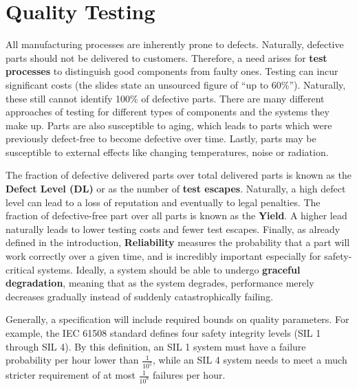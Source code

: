 \documentclass{report}
\newcommand{\tbf}{\textbf}
\newcommand*{\newpar}{\par\vspace{\baselineskip}\noindent} %
\begin{document}
\section{Quality Testing}
All manufacturing processes are inherently prone to defects. Naturally, defective parts should not be delivered to customers. Therefore, a need arises for \tbf{test processes} to distinguish good components from faulty ones. Testing can incur significant costs (the slides state an unsourced figure of ``up to 60\%''). Naturally, these still cannot identify 100\% of defective parts. There are many different approaches of testing for different types of components and the systems they make up. Parts are also susceptible to aging, which leads to parts which were previously defect-free to become defective over time. Lastly, parts may be susceptible to external effects like changing temperatures, noise or radiation.
\newpar
The fraction of defective delivered parts over total delivered parts is known as the \tbf{Defect Level (DL)} or as the number of \tbf{test escapes}. Naturally, a high defect level can lead to a loss of reputation and eventually to legal penalties. The fraction of defective-free part over all parts is known as the \tbf{Yield}. A higher lead naturally leads to lower testing costs and fewer test escapes. Finally, as already defined in the introduction, \tbf{Reliability} measures the probability that a part will work correctly over a given time, and is incredibly important especially for safety-critical systems. Ideally, a system should be able to undergo \tbf{graceful degradation}, meaning that as the system degrades, performance merely decreases gradually instead of suddenly catastrophically failing.
\newpar
Generally, a specification will include required bounds on quality parameters. For example, the IEC 61508 standard defines four safety integrity levels (SIL 1 through SIL 4). By this definition, an SIL 1 system must have a failure probability per hour lower than $\frac{1}{10^5}$, while an SIL 4 system needs to meet a much stricter requirement of at most $\frac{1}{10^8}$ failures per hour.
%
\end{document}
